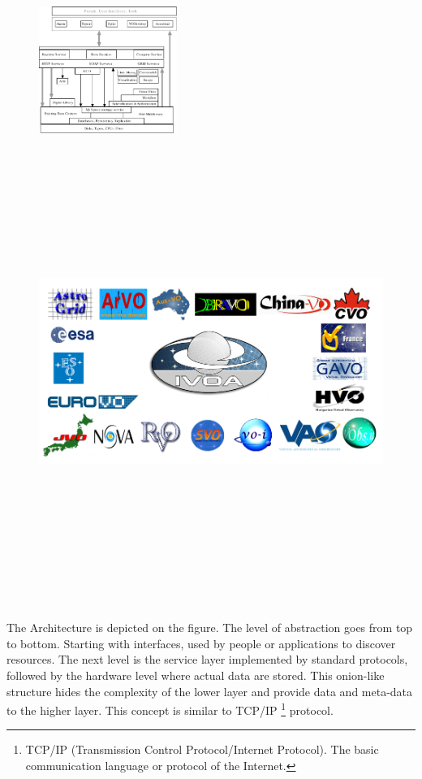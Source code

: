    \begin{figure}
     \vspace{0pt}
     \begin{center}
       \ifpdf
       \includegraphics[width=0.4\textwidth]{architecture}
       \else
       \includegraphics[bb = 92 86 545 742, height=6in]{ivoamembers.jpg}
       \fi
     \end{center}
     \vspace{-15pt}
        \label{FigArchitecture}
     \vspace{-5pt}
   \end{figure}


The Architecture is depicted on the figure. The level of abstraction
goes from top to bottom. Starting with interfaces, used by people or
applications to discover resources.  The next level is the service
layer implemented by standard protocols, followed by the hardware
level where actual data are stored. This onion-like structure hides
the complexity of the lower layer and provide data and meta-data to
the higher layer. This concept is similar to TCP/IP \footnote{TCP/IP
  (Transmission Control Protocol/Internet Protocol).  The basic
  communication language or protocol of the Internet.}  protocol.



